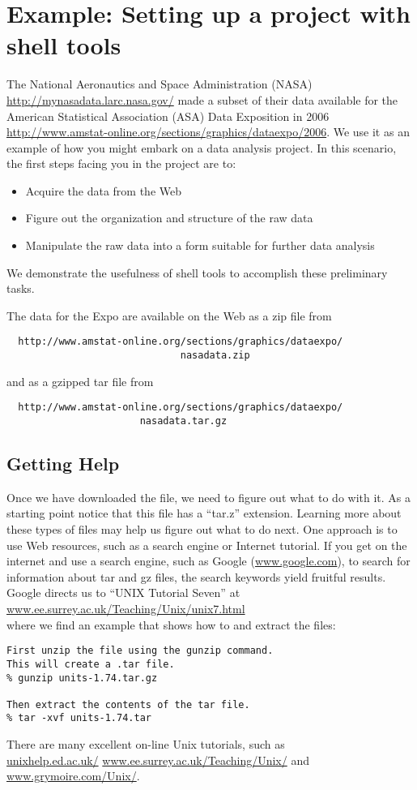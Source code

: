\section{Example: Setting up a project with shell tools}
The National Aeronautics and Space Administration (NASA)
\\
\url{http://mynasadata.larc.nasa.gov/} made a subset
of their data available for the American Statistical Association (ASA)
Data Exposition in 2006
\\
\url{http://www.amstat-online.org/sections/graphics/dataexpo/2006}.   
We use it as an example of how you might embark on a data analysis
project.  In this scenario, the first steps facing you in the project
are to:
\begin{itemize}
\item Acquire the data from the Web
\item Figure out the organization and structure of the raw data
\item Manipulate the raw data into a form suitable for further data analysis
\end{itemize}
We demonstrate the usefulness of shell tools to accomplish these
preliminary tasks.


The data for the Expo are available on the Web as a zip file from
\begin{verbatim}
  http://www.amstat-online.org/sections/graphics/dataexpo/
                              nasadata.zip
\end{verbatim}
and as a gzipped tar file from
\begin{verbatim}
  http://www.amstat-online.org/sections/graphics/dataexpo/
                       nasadata.tar.gz
\end{verbatim}


\subsection{Getting Help}
Once we have downloaded the file, we need to figure out what to do
with it.  As a starting point notice that this file has a ``tar.z''
extension.  Learning more about these types of files may help us
figure out what to do next.  One approach is to use Web resources, such as a search engine
or Internet tutorial. If you get
on the internet and use a search engine, such as Google
(\url{www.google.com}), to search for information about tar and gz
files, the search keywords  yield fruitful
results.  Google directs us to ``UNIX Tutorial Seven'' at
\\
\url{www.ee.surrey.ac.uk/Teaching/Unix/unix7.html}\\
 where we find an
example that shows how to  and extract the files:
\begin{verbatim}
First unzip the file using the gunzip command. 
This will create a .tar file. 
% gunzip units-1.74.tar.gz

Then extract the contents of the tar file.  
% tar -xvf units-1.74.tar
\end{verbatim}
There are many excellent on-line Unix tutorials, such as
\\
\url{unixhelp.ed.ac.uk/} \url{www.ee.surrey.ac.uk/Teaching/Unix/} and
\url{www.grymoire.com/Unix/}.


